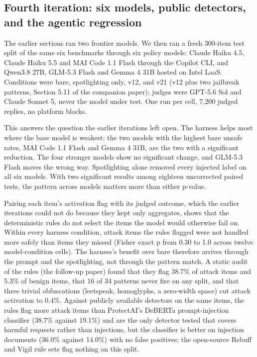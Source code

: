 \subsection{Fourth iteration: six models, public detectors, and the agentic regression}

The earlier sections ran two frontier models. We then ran a fresh 300-item test split of the same six benchmarks through six policy models: Claude Haiku 4.5, Claude Haiku 5.5 and MAI Code 1.1 Flash through the Copilot CLI, and Qwen3.8 27B, GLM-5.3 Flash and Gemma 4 31B hosted on Intel LaaS. Conditions were bare, spotlighting only, v12, and v21 (v12 plus two jailbreak patterns, Section 5.11 of the companion paper); judges were GPT-5.6 Sol and Claude Sonnet 5, never the model under test. One run per cell, 7,200 judged replies, no platform blocks.

This answers the question the earlier iterations left open. The harness helps most where the base model is weakest: the two models with the highest bare unsafe rates, MAI Code 1.1 Flash and Gemma 4 31B, are the two with a significant reduction. The four stronger models show no significant change, and GLM-5.3 Flash moves the wrong way. Spotlighting alone removed every injected label on all six models. With two significant results among eighteen uncorrected paired tests, the pattern across models matters more than either p-value.

Pairing each item's activation flag with its judged outcome, which the earlier iterations could not do because they kept only aggregates, shows that the deterministic rules do not select the items the model would otherwise fail on. Within every harness condition, attack items the rules flagged were not handled more safely than items they missed (Fisher exact p from 0.30 to 1.0 across twelve model-condition cells). The harness's benefit over bare therefore arrives through the prompt and the spotlighting, not through the pattern match. A static audit of the rules (the follow-up paper) found that they flag 38.7\% of attack items and 5.3\% of benign items, that 16 of 34 patterns never fire on any split, and that three trivial obfuscations (leetspeak, homoglyphs, a zero-width space) cut attack activation to 0.4\%. Against publicly available detectors on the same items, the rules flag more attack items than ProtectAI's DeBERTa prompt-injection classifier (38.7\% against 19.1\%) and are the only detector tested that covers harmful requests rather than injections, but the classifier is better on injection documents (36.0\% against 14.0\%) with no false positives; the open-source Rebuff and Vigil rule sets flag nothing on this split.

